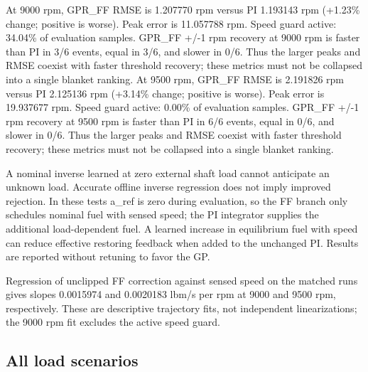 At 9000 rpm, GPR\_\allowbreak FF RMSE is 1.207770 rpm versus PI 1.193143 rpm (+1.23\% change; positive is worse). Peak error is 11.057788 rpm. Speed guard active: 34.04\% of evaluation samples.
GPR\_\allowbreak FF +/-1 rpm recovery at 9000 rpm is faster than PI in 3/6 events, equal in 3/6, and slower in 0/6. Thus the larger peaks and RMSE coexist with faster threshold recovery; these metrics must not be collapsed into a single blanket ranking.
At 9500 rpm, GPR\_\allowbreak FF RMSE is 2.191826 rpm versus PI 2.125136 rpm (+3.14\% change; positive is worse). Peak error is 19.937677 rpm. Speed guard active: 0.00\% of evaluation samples.
GPR\_\allowbreak FF +/-1 rpm recovery at 9500 rpm is faster than PI in 6/6 events, equal in 0/6, and slower in 0/6. Thus the larger peaks and RMSE coexist with faster threshold recovery; these metrics must not be collapsed into a single blanket ranking.

A nominal inverse learned at zero external shaft load cannot anticipate an unknown load. Accurate offline inverse regression does not imply improved rejection. In these tests a\_\allowbreak ref is zero during evaluation, so the FF branch only schedules nominal fuel with sensed speed; the PI integrator supplies the additional load-dependent fuel. A learned increase in equilibrium fuel with speed can reduce effective restoring feedback when added to the unchanged PI. Results are reported without retuning to favor the GP.

Regression of unclipped FF correction against sensed speed on the matched runs gives slopes 0.0015974 and 0.0020183 lbm/s per rpm at 9000 and 9500 rpm, respectively. These are descriptive trajectory fits, not independent linearizations; the 9000 rpm fit excludes the active speed guard.

\subsection{All load scenarios}

